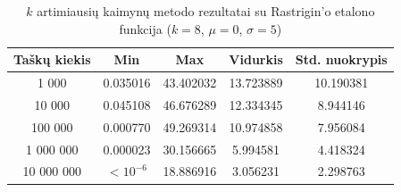 \begin{table}[H]
    \centering
    \begin{tabular}{|c|c|c|c|c|}
        \hline
        \textbf{Taškų kiekis} & \textbf{Min} & \textbf{Max} & \textbf{Vidurkis} & \textbf{Std. nuokrypis} \\ \hline
        1 000        & 0.035016 & 43.402032 & 13.723889 & 10.190381 \\ \hline
        10 000       & 0.045108 & 46.676289 & 12.334345 & 8.944146 \\ \hline
        100 000      & 0.000770 & 49.269314 & 10.974858 & 7.956084 \\ \hline
        1 000 000    & 0.000023 & 30.156665 & 5.994581 & 4.418324 \\ \hline
        10 000 000   & $<10^{-6}$ & 18.886916 & 3.056231 & 2.298763 \\ \hline
    \end{tabular}
    \caption{$k$ artimiausių kaimynų metodo rezultatai su Rastrigin'o etalono funkcija ($k = 8$, $\mu = 0$, $\sigma = 5$)}
\end{table}